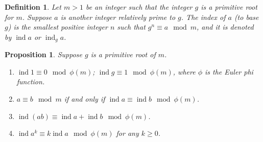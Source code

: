 \documentclass[12pt]{article}
\newtheorem*{defn}{Definition}
\newtheorem*{prop}{Proposition}
\theoremstyle{definition}
\newcommand{\ind}{\operatorname{ind}}
\begin{document}
\begin{defn}
Let $m>1$ be an integer such that the integer $g$ is a primitive root for $m$. Suppose $a$ is another integer relatively prime to $g$. The index of $a$ (to base $g$) is the smallest positive integer $n$ such that $g^n\equiv a \mod m$, and it is denoted by $\operatorname{ind} a$ or $\operatorname{ind}_g a$.
\end{defn}

\begin{prop}
Suppose $g$ is a primitive root of $m$.
\begin{enumerate}
\item $\ind 1 \equiv 0 \mod \phi(m)$; $\ind g \equiv 1 \mod \phi(m)$, where $\phi$ is the Euler phi function.

\item $a\equiv b \mod m$ if and only if $\ind a \equiv \ind b \mod \phi(m)$.

\item $\ind (ab) \equiv \ind a + \ind b \mod \phi(m)$.

\item $\ind a^k \equiv k\ind a \mod \phi(m)$ for any $k\geq 0$.
\end{enumerate}
\end{prop}
\end{document}
